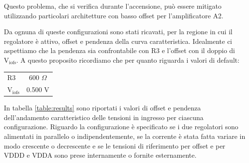 Questo problema, che si verifica durante l'accensione, può essere mitigato utilizzando particolari architetture con basso offset per l'amplificatore A2.

Da ognuna di queste configurazioni sono stati ricavati, per la regione in cui il regolatore è attivo, offset e pendenza della curva caratteristica. Idealmente ci aspettiamo che la pendenza sia confrontabile con R3 e l'offset con il doppio di $\mathrm{V_{iofs}}$. A questo proposito ricordiamo che per quanto riguarda i valori di default: 
\begin{center}
\begin{tabular}{lc}
\hline
$\mathrm{R3}$ & 600 $\Omega$ \\%
$\mathrm{V_{iofs}}$ & 0.500 V\\ 
\hline
\end{tabular}
\end{center}

In tabella \ref{table:results} sono riportati i valori di offset e pendenza dell'andamento caratteristico delle tensioni in ingresso per ciascuna configurazione. Riguardo la configurazione è specificato se i due regolatori sono alimentati in parallelo o indipendentemente, se la corrente è stata fatta variare in modo crescente o decrescente e se le tensioni di riferimento per offset e per VDDD e VDDA sono prese internamente o fornite esternamente.

